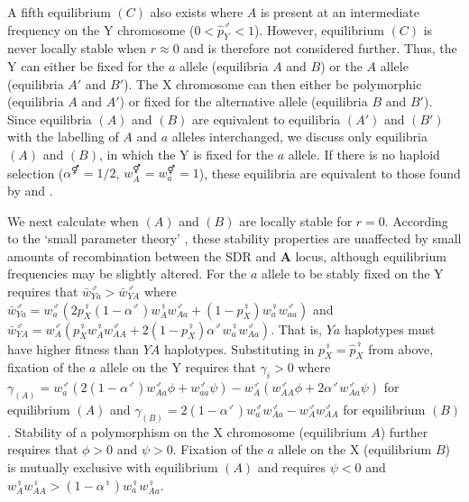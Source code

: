 \documentclass[12pt]{article}
\begin{document}
\noindent
A fifth equilibrium $(C)$ also exists where $A$ is present at an intermediate frequency on the Y chromosome ($0<\hat{p}_{Y}^{\male}<1$). However, equilibrium $(C)$ is never locally stable when $r \approx 0$ and is therefore not considered further. 
Thus, the Y can either be fixed for the $a$ allele (equilibria $A$ and $B$) or the $A$ allele (equilibria $A'$ and $B'$).
The X chromosome can then either be polymorphic (equilibria $A$ and $A'$) or fixed for the alternative allele (equilibria $B$ and $B'$).
Since equilibria $(A)$ and $(B)$ are equivalent to equilibria $(A')$ and $(B')$ with the labelling of $A$ and $a$ alleles interchanged, we discuss only equilibria $(A)$ and $(B)$, in which the Y is fixed for the $a$ allele. 
If there is no haploid selection ($\alpha^{\Hermaphrodite}=1/2$, $w_{A}^{\Hermaphrodite}=w_{a}^{\Hermaphrodite}=1$), these equilibria are equivalent to those found by \cite{Lloyd1977} and \cite{Otto2014}.

We next calculate when $(A)$ and $(B)$ are locally stable for $r=0$. According to the `small parameter theory' \citep{Karlin:1972ab,Karlin:1972dq}, these stability properties are unaffected by small amounts of recombination between the SDR and \textbf{A} locus, although equilibrium frequencies may be slightly altered. 
For the $a$ allele to be stably fixed on the Y requires that $\bar{w}_{Ya}^{\male}>\bar{w}_{YA}^{\male}$ where $\bar{w}_{Ya}^{\male}=w_{a}^{\male}(2 p_{X}^{\female}(1-\alpha^{\male}) w_{A}^{\female} w_{Aa}^{\male}+ (1-p_{X}^{\female})w_{a}^{\female} w_{aa}^{\male} )$ and $\bar{w}_{YA}^{\male}=w_{A}^{\male}(p_{X}^{\female} w_{A}^{\female} w_{AA}^{\male}+ 2 (1-p_{X}^{\female})\alpha^{\male}w_{a}^{\female} w_{Aa}^{\male} )$. That is, $Ya$ haplotypes must have higher fitness than $YA$ haplotypes.  
Substituting in $p_{X}^{\female} = \hat{p}_{X}^{\female}$ from above, fixation of the $a$ allele on the Y requires that $\gamma_{i}>0$ where $\gamma_{(A)}=w_{a}^{\male}(2(1-\alpha^{\male})w_{Aa}^{\male} \phi + w_{aa}^{\male} \psi)-w_{A}^{\male}( w_{AA}^{\male} \phi + 2\alpha^{\male}w_{Aa}^{\male} \psi)$ for equilibrium $(A)$ and $\gamma_{(B)}=2(1-\alpha^{\male})w_{a}^{\male}w_{Aa}^{\male}-w_{A}^{\male}w_{AA}^{\male}$ for equilibrium $(B)$.
Stability of a polymorphism on the X chromosome (equilibrium $A$) further requires that $\phi >0$ and $\psi >0$. 
Fixation of the $a$ allele on the X (equilibrium $B$) is mutually exclusive with equilibrium $(A)$ and requires $\psi<0$ and $w_{A}^{\female}w_{AA}^{\female}>(1-\alpha^{\female})w_{a}^{\female}w_{Aa}^{\female}$. 
\end{document}
